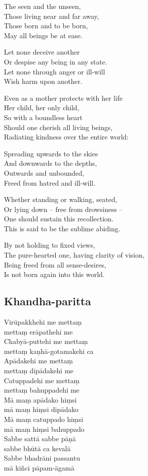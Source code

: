 The seen and the unseen,\\
Those living near and far away,\\
Those born and to be born,\\
May all beings be at ease.

Let none deceive another\\
Or despise any being in any state.\\
Let none through anger or ill-will\\
Wish harm upon another.

Even as a mother protects with her life\\
Her child, her only child,\\
So with a boundless heart\\
Should one cherish all living beings,\\
Radiating kindness over the entire world:

Spreading upwards to the skies\\
And downwards to the depths,\\
Outwards and unbounded,\\
Freed from hatred and ill-will.

Whether standing or walking, seated, \\
Or lying down -- free from drowsiness --\\
One should sustain this recollection.\\
This is said to be the sublime abiding.

By not holding to fixed views,\\
The pure-hearted one, having clarity of vision,\\
Being freed from all sense-desires,\\
Is not born again into this world.


\subsection{Khandha-paritta}
\label{virupakkhehi}


Virūpakkhehi me mettaṃ\\\vin mettaṃ erāpathehi me\\
Chabyā-puttehi me mettaṃ\\\vin mettaṃ kaṇhā-gotamakehi ca\\
Apādakehi me mettaṃ\\\vin mettaṃ dipādakehi me\\
Catuppadehi me mettaṃ\\\vin mettaṃ bahuppadehi me\\
Mā maṃ apādako hiṃsi\\\vin mā maṃ hiṃsi dipādako\\
Mā maṃ catuppado hiṃsi\\\vin mā maṃ hiṃsi bahuppado\\
Sabbe sattā sabbe pāṇā\\\vin sabbe bhūtā ca kevalā\\
Sabbe bhadrāni passantu\\\vin mā kiñci pāpam-āgamā

